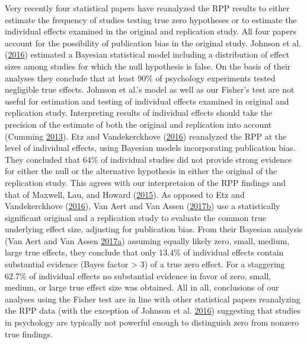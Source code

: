 \documentclass[a5paper]{book}
\begin{document}
Very recently four statistical papers have reanalyzed the RPP results to
either estimate the frequency of studies testing true zero hypotheses or
to estimate the individual effects examined in the original and
replication study. All four papers account for the possibility of
publication bias in the original study. Johnson et al.
(\protect\hyperlink{ref-doi:10.1080ux2f01621459.2016.1240079}{2016})
estimated a Bayesian statistical model including a distribution of
effect sizes among studies for which the null hypothesis is false. On
the basis of their analyses they conclude that at least 90\% of
psychology experiments tested negligible true effects. Johnson et al.'s
model as well as our Fisher's test are not useful for estimation and
testing of individual effects examined in original and replication
study. Interpreting results of individual effects should take the
precision of the estimate of both the original and replication into
account (Cumming
\protect\hyperlink{ref-doi:10.1177ux2f0956797613504966}{2013}). Etz and
Vandekerckhove
(\protect\hyperlink{ref-doi:10.1371ux2fjournal.pone.0149794}{2016})
reanalyzed the RPP at the level of individual effects, using Bayesian
models incorporating publication bias. They concluded that 64\% of
individual studies did not provide strong evidence for either the null
or the alternative hypothesis in either the original of the replication
study. This agrees with our interpretaion of the RPP findings and that
of Maxwell, Lau, and Howard
(\protect\hyperlink{ref-doi:10.1037ux2fa0039400}{2015}). As opposed to
Etz and Vandekerckhove
(\protect\hyperlink{ref-doi:10.1371ux2fjournal.pone.0149794}{2016}), Van
Aert and Van Assen
(\protect\hyperlink{ref-doi:10.3758ux2fs13428-017-0967-6}{2017}\protect\hyperlink{ref-doi:10.3758ux2fs13428-017-0967-6}{b})
use a statistically significant original and a replication study to
evaluate the common true underlying effect size, adjusting for
publication bias. From their Bayesian analysis (Van Aert and Van Assen
\protect\hyperlink{ref-doi:10.1371ux2fjournal.pone.0175302}{2017}\protect\hyperlink{ref-doi:10.1371ux2fjournal.pone.0175302}{a})
assuming equally likely zero, small, medium, large true effects, they
conclude that only 13.4\% of individual effects contain substantial
evidence (Bayes factor \textgreater{} 3) of a true zero effect. For a
staggering 62.7\% of individual effects no substantial evidence in favor
of zero, small, medium, or large true effect size was obtained. All in
all, conclusions of our analyses using the Fisher test are in line with
other statistical papers reanalyzing the RPP data (with the exception of
Johnson et al.
\protect\hyperlink{ref-doi:10.1080ux2f01621459.2016.1240079}{2016})
suggesting that studies in psychology are typically not powerful enough
to distinguish zero from nonzero true findings.
\end{document}
